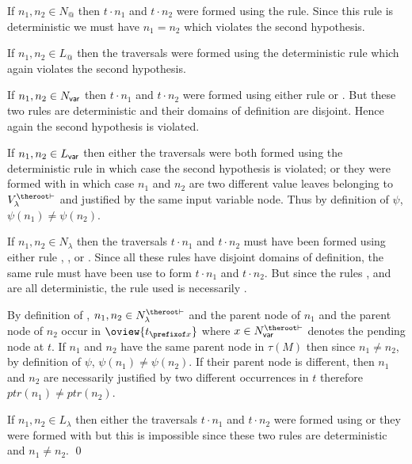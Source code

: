 \begin{compactitem}
\item If $n_1, n_2 \in N_@$ then $t
\cdot n_1$ and $t \cdot n_2$ were formed using the 
rule. Since this rule is deterministic we must have $n_1=n_2$ which
violates the second hypothesis.

\item If $n_1, n_2 \in L_@$ then the traversals were formed using the deterministic rule
 which again violates the second
hypothesis.

\item If $n_1,n_2\in N_{\sf var}$ then
     $t \cdot n_1$ and $t \cdot n_2$ were formed using either rule  or .
     But these two rules are deterministic and their domains of definition are disjoint. Hence again the second
     hypothesis is violated.

\item If  $n_1, n_2 \in L_{\sf var}$ then either the traversals were both formed using the deterministic rule
 in which case the second hypothesis
is violated; or they were formed with 
in which case $n_1$ and $n_2$ are two different value leaves belonging to
$V^{\theroot\vdash}_\lambda$ and justified by the same input variable node.
Thus by definition of $\psi$, $\psi(n_1)\neq\psi(n_2)$.

\item If  $n_1,n_2\in N_\lambda$ then the traversals $t \cdot n_1$
    and $t \cdot n_2$ must have been formed using either rule
    , ,  or . Since all these rules have
    disjoint domains of definition, the same rule must have been use to
    form $t \cdot n_1$ and $t \cdot n_2$.
    But since the rules ,  and  are all deterministic,
    the rule used is necessarily .

    By definition of , $n_1,n_2\in N_\lambda^{\theroot\vdash}$ and the parent node of $n_1$ and the parent node of $n_2$  occur in  $\oview{t_{\prefixof x}}$ where $x \in N^{\theroot\vdash}_{\sf var}$
    denotes the pending node at $t$. If $n_1$ and $n_2$ have the same
    parent node in $\tau(M)$ then since $n_1\neq n_2$, by definition of
    $\psi$, $\psi(n_1)\neq \psi(n_2)$. If their parent node is
    different, then $n_1$ and $n_2$ are necessarily justified by two different
    occurrences in $t$ therefore $ptr(n_1) \neq ptr(n_2)$.

\item If  $n_1,n_2\in L_\lambda$ then either the traversals $t \cdot n_1$
    and $t \cdot n_2$ were formed using
     or they were formed with
     but this is impossible since these two rules are
    deterministic and $n_1 \neq n_2$. \qed
\end{compactitem}


